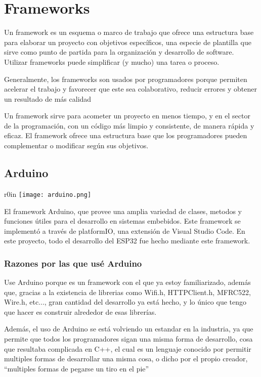 \documentclass[../informe_krapp.tex]{subfiles}
\begin{document}
\renewcommand{\subsectionbreak}{}
\section{Frameworks}
Un framework es un esquema o marco de trabajo que ofrece una estructura base para elaborar un proyecto con objetivos específicos, una especie de plantilla que sirve como punto de partida para la organización y desarrollo de software. Utilizar frameworks puede simplificar (y mucho) una tarea o proceso.

Generalmente, los frameworks son usados por programadores porque permiten acelerar el trabajo y favorecer que este sea colaborativo, reducir errores y obtener un resultado de más calidad

Un framework sirve para acometer un proyecto en menos tiempo, y en el sector de la programación, con un código más limpio y consistente, de manera rápida y eficaz. El framework ofrece una estructura base que los programadores pueden complementar o modificar según sus objetivos.
\subsection{Arduino}
\begin{wrapfigure}{r}{0in}
	\texttt{[image: arduino.png]}
\end{wrapfigure}
El framework Arduino, que provee una amplia variedad de
clases, metodos y funciones útiles para el desarrollo en sistemas embebidos.
Este framework se implementó a través de platformIO, una extensión de Visual Studio Code.
En este proyecto, todo el desarrollo del ESP32 fue hecho mediante este framework.

\subsubsection{Razones por las que usé Arduino}
Use Arduino porque es un framework con el que ya estoy familiarizado, además que, gracias a la existencia de librerias como Wifi.h, HTTPClient.h, MFRC522, Wire.h, etc..., gran cantidad del desarrollo ya está hecho, y lo único que tengo que hacer es construir alrededor de esas librerías.

Además, el uso de Arduino se está volviendo un estandar en la industria, ya que permite que todos los programadores sigan una misma forma de desarrollo,
cosa que resultaba complicada en C++, el cual es un lenguaje conocido por permitir multiples formas de desarrollar una misma cosa, o dicho por el propio creador, ``multiples formas de pegarse un tiro en el pie''
\clearpage
\end{document}
